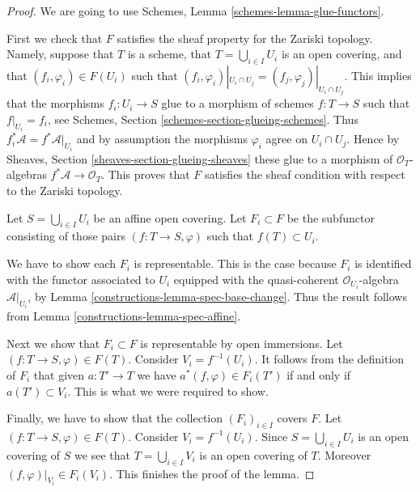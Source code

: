 \begin{proof}

We are going to use Schemes, Lemma \ref{schemes-lemma-glue-functors}.

\medskip\noindent
First we check that $F$ satisfies the sheaf property for the
Zariski topology. Namely, suppose that $T$ is a scheme,
that $T = \bigcup_{i \in I} U_i$ is an open covering,
and that $(f_i, \varphi_i) \in F(U_i)$ such that
$(f_i, \varphi_i)|_{U_i \cap U_j} = (f_j, \varphi_j)|_{U_i \cap U_j}$.
This implies that the morphisms $f_i : U_i \to S$
glue to a morphism of schemes $f : T \to S$ such that
$f|_{U_i} = f_i$, see Schemes, Section \ref{schemes-section-glueing-schemes}.
Thus $f_i^*\mathcal{A} = f^*\mathcal{A}|_{U_i}$ and by assumption the
morphisms $\varphi_i$ agree on $U_i \cap U_j$. Hence by Sheaves,
Section \ref{sheaves-section-glueing-sheaves} these glue to a
morphism of $\mathcal{O}_T$-algebras $f^*\mathcal{A} \to \mathcal{O}_T$.
This proves that $F$ satisfies the sheaf condition with respect to
the Zariski topology.

\medskip\noindent
Let $S = \bigcup_{i \in I} U_i$ be an affine open covering.
Let $F_i \subset F$ be the subfunctor consisting of
those pairs $(f : T \to S, \varphi)$ such that
$f(T) \subset U_i$.

\medskip\noindent
We have to show each $F_i$ is representable.
This is the case because $F_i$ is identified with
the functor associated to $U_i$ equipped with
the quasi-coherent $\mathcal{O}_{U_i}$-algebra $\mathcal{A}|_{U_i}$,
by Lemma \ref{constructions-lemma-spec-base-change}.
Thus the result follows from Lemma \ref{constructions-lemma-spec-affine}.

\medskip\noindent
Next we show that $F_i \subset F$ is representable by open immersions.
Let $(f : T \to S, \varphi) \in F(T)$. Consider $V_i = f^{-1}(U_i)$.
It follows from the definition of $F_i$ that given $a : T' \to T$
we have $a^*(f, \varphi) \in F_i(T')$ if and only if $a(T') \subset V_i$.
This is what we were required to show.

\medskip\noindent
Finally, we have to show that the collection $(F_i)_{i \in I}$
covers $F$. Let $(f : T \to S, \varphi) \in F(T)$.
Consider $V_i = f^{-1}(U_i)$. Since $S = \bigcup_{i \in I} U_i$
is an open covering of $S$ we see that $T = \bigcup_{i \in I} V_i$
is an open covering of $T$. Moreover $(f, \varphi)|_{V_i} \in F_i(V_i)$.
This finishes the proof of the lemma.
\end{proof}

